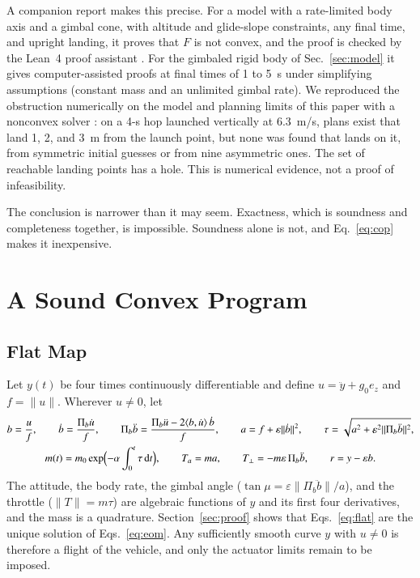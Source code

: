 \documentclass[10pt,letterpaper]{article}
\theoremstyle{aiaa}
\newcommand{\norm}[1]{\lVert #1\rVert}
\newcommand{\ip}[2]{\langle #1,#2\rangle}
\newcommand{\ez}{e_z}
\newcommand{\Pib}{\Pi_b}
\begin{document}
A companion report \cite{report} makes this precise. For a model with a rate-limited body axis and a gimbal cone, with altitude
and glide-slope constraints, any final time, and upright landing, it proves that $F$ is not convex, and the proof is checked by
the Lean~4 proof assistant \cite{lean4,mathlib}. For the gimbaled rigid body of Sec.~\ref{sec:model} it gives computer-assisted
proofs at final times of 1 to 5~s under simplifying assumptions (constant mass and an unlimited gimbal rate). We reproduced the obstruction numerically on the model and planning limits of this paper with
a nonconvex solver \cite{ipopt}: on a 4-s hop launched vertically at 6.3~m/s, plans exist that land 1, 2, and 3~m from the
launch point, but none was found that lands on it, from symmetric initial guesses or from nine asymmetric ones. The set of
reachable landing points has a hole. This is numerical evidence, not a proof of infeasibility.

The conclusion is narrower than it may seem. Exactness, which is soundness and completeness together, is impossible. Soundness
alone is not, and Eq.~\eqref{eq:cop} makes it inexpensive.

\section{A Sound Convex Program}\label{sec:program}
\subsection{Flat Map}
Let $y(t)$ be four times continuously differentiable and define $u=\ddot y+g_0\ez$ and $f=\norm u$. Wherever $u\ne0$, let
\begin{equation}\label{eq:flat}
\begin{gathered}
b=\frac uf,\qquad \dot b=\frac{\Pib\dot u}{f},\qquad \Pib\ddot b=\frac{\Pib\ddot u-2\ip b{\dot u}\,\dot b}{f},\qquad
a=f+\varepsilon\norm{\dot b}^2,\qquad \tau=\sqrt{a^2+\varepsilon^2\norm{\Pib\ddot b}^2},\\
m(t)=m_0\exp\Bigl(-\alpha\int_0^t\tau\,\mathrm dt\Bigr),\qquad T_a=ma,\qquad T_\perp=-m\varepsilon\,\Pib\ddot b,\qquad r=y-\varepsilon b .
\end{gathered}
\end{equation}
The attitude, the body rate, the gimbal angle ($\tan\mu=\varepsilon\norm{\Pib\ddot b}/a$), and the throttle ($\norm T=m\tau$) are
algebraic functions of $y$ and its first four derivatives, and the mass is a quadrature. Section~\ref{sec:proof} shows that
Eqs.~\eqref{eq:flat} are the unique solution of Eqs.~\eqref{eq:eom}. Any sufficiently smooth curve $y$ with $u\ne0$ is
therefore a flight of the vehicle, and only the actuator limits remain to be imposed.
\end{document}

